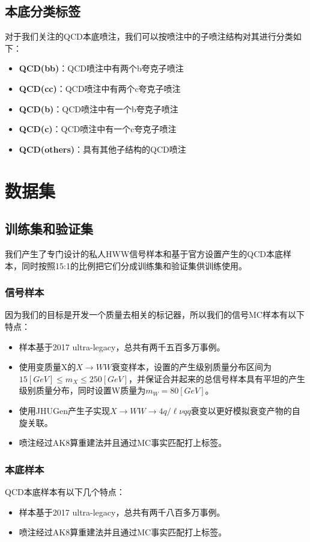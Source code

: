 \subsection{本底分类标签}
对于我们关注的QCD本底喷注，我们可以按喷注中的子喷注结构对其进行分类如下：
\begin{itemize}\label{eq:5.2}
    \item \textbf{QCD(bb)}：QCD喷注中有两个b夸克子喷注
    \item \textbf{QCD(cc)}：QCD喷注中有两个c夸克子喷注
    \item \textbf{QCD(b)}：QCD喷注中有一个b夸克子喷注
    \item \textbf{QCD(c)}：QCD喷注中有一个c夸克子喷注
    \item \textbf{QCD(others)}：具有其他子结构的QCD喷注
\end{itemize}
\section{数据集}
\subsection{训练集和验证集}
我们产生了专门设计的私人HWW信号样本和基于官方设置产生的QCD本底样本，同时按照15:1的比例把它们分成训练集和验证集供训练使用。
\subsubsection{信号样本}
因为我们的目标是开发一个质量去相关的标记器，所以我们的信号MC样本有以下特点：
\begin{itemize}
    \item 样本基于2017 ultra-legacy，总共有两千五百多万事例。
    \item 使用变质量X的$X\to WW$衰变样本，设置的产生级别质量分布区间为$15 [\si{GeV}]\leq m_X\leq 250[\si{GeV}]$，并保证合并起来的总信号样本具有平坦的产生级别质量分布，同时设置W质量为$m_W=80[\si{GeV}]$。
    \item 使用JHUGen产生子实现$X\to WW\to4q/\ell \nu qq$衰变以更好模拟衰变产物的自旋关联。
    \item 喷注经过AK8算重建法并且通过MC事实匹配打上标签。
\end{itemize}

\subsubsection{本底样本}
QCD本底样本有以下几个特点：
\begin{itemize}
    \item 样本基于2017 ultra-legacy，总共有两千八百多万事例。
    \item 喷注经过AK8算重建法并且通过MC事实匹配打上标签。
\end{itemize}
